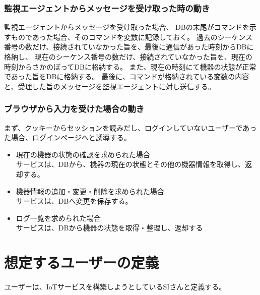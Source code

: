 \subsubsection{監視エージェントからメッセージを受け取った時の動き}
監視エージェントからメッセージを受け取った場合、
DBの末尾がコマンドを示すものであった場合、そのコマンドを変数に記録しておく。
過去のシーケンス番号の数だけ、接続されていなかった旨を、最後に通信があった時刻からDBに格納し、
現在のシーケンス番号の数だけ、接続されていなかった旨を、現在の時刻からさかのぼってDBに格納する。
また、現在の時刻にて機器の状態が正常であった旨をDBに格納する。
最後に、コマンドが格納されている変数の内容と、受理した旨のメッセージを監視エージェントに対し送信する。

\subsubsection{ブラウザから入力を受けた場合の動き}
まず、クッキーからセッションを読みだし、ログインしていないユーザーであった場合、ログインページヘと誘導する。
\begin{itemize}
	\item 現在の機器の状態の確認を求められた場合\\
		サービスは、DBから、機器の現在の状態とその他の機器情報を取得し、返却する。
	\item 機器情報の追加・変更・削除を求められた場合\\
		サービスは、DBへ変更を保存する。
	\item ログ一覧を求められた場合\\
		サービスは、DBから機器の状態を取得・整理し、返却する
\end{itemize}

\section{想定するユーザーの定義}
ユーザーは、IoTサービスを構築しようとしているSIさんと定義する。

